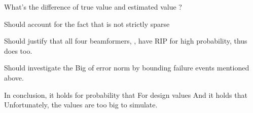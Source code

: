 {
\I What's the difference of true value  and estimated value ?

\I Should account for the fact that  is not strictly sparse

\I Should justify that all four beamformers, , have RIP for high probability, thus  does too.

\I Should investigate the Big  of error norm by bounding failure events mentioned above.
}
{
\I In conclusion, it holds for probability  that
%
\I For design values
%
\I And it holds that
%
\I Unfortunately, the values are too big to simulate.
}


